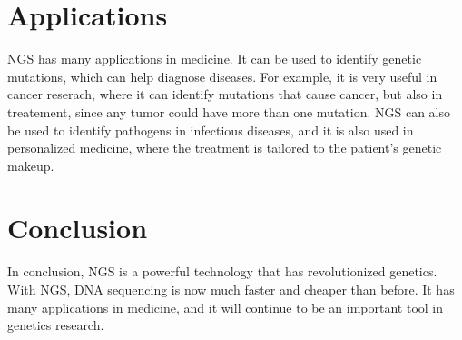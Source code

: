 \documentclass{article}
\begin{document}
\section{Applications}
NGS has many applications in medicine. It can be used to identify genetic mutations, which can help diagnose diseases. For example, it is very useful in cancer reserach, where it can identify mutations that cause cancer, but also in treatement, since any tumor could have more than one mutation. NGS can also be used to identify pathogens in infectious diseases, and it is also used in personalized medicine, where the treatment is tailored to the patient's genetic makeup. 

\section{Conclusion}
In conclusion, NGS is a powerful technology that has revolutionized genetics. With NGS, DNA sequencing is now much faster and cheaper than before. It has many applications in medicine, and it will continue to be an important tool in genetics research.
\end{document}
